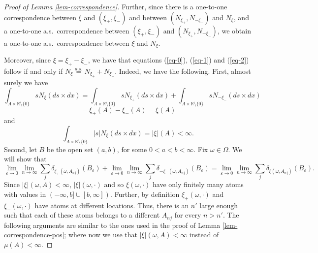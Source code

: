 \documentclass{article}
\theoremstyle{plain}
\theoremstyle{remark}
\begin{document}
\begin{proof}[Proof of Lemma \ref{lem-correspondence}]
	Further, since there is a one-to-one correspondence between $\xi$ and $(\xi_+,\xi_-)$ and between $(N_{\xi_+},N_{-\xi_-})$ and $N_{\xi}$, and a one-to-one a.s.~correspondence between $(\xi_+,\xi_-)$ and $(N_{\xi_+},N_{-\xi_-})$, we obtain a one-to-one a.s.~correspondence between $\xi$ and $N_{\xi}$.
	
	Moreover, since $\xi=\xi_+-\xi_-$, we have that equations (\ref{eq-0}), (\ref{eq-1}) and (\ref{eq-2}) follow if and only if $N_\xi\stackrel{a.s.}{=}N_{\xi_+}+N_{\xi_-}$. Indeed, we have the following. First, almost surely we have
	\begin{equation*}
		\int_{A\times \mathbb{R}\setminus\{0\}} sN_{\xi}(ds\times dx)= \int_{A\times \mathbb{R}\setminus\{0\}} sN_{\xi_+}(ds\times dx)+	\int_{A\times \mathbb{R}\setminus\{0\}} sN_{-\xi_-}(ds\times dx)
	\end{equation*}
	\begin{equation*}
		=\xi_+(A)-	\xi_-(A)= \xi(A)
	\end{equation*}
	and
	\begin{equation*}
		\int_{A\times \mathbb{R}\setminus\{0\}} |s|N_{\xi}(ds\times dx)= |\xi|(A)<\infty.
	\end{equation*}
	Second, let $B$ be the open set $(a,b)$, for some $0<a<b<\infty$. Fix $\omega\in\Omega$. We will show that
	\begin{equation}\label{delta}
		\lim\limits_{\varepsilon\to0}\lim\limits_{n\to\infty}\sum_{j}\delta_{\xi_+(\omega, A_{nj})}(B_\varepsilon)+	\lim\limits_{\varepsilon\to0}\lim\limits_{n\to\infty}\sum_{j}\delta_{-\xi_-(\omega,A_{nj})}(B_{\varepsilon})				=	\lim\limits_{\varepsilon\to0}\lim\limits_{n\to\infty}\sum_{j}\delta_{\xi(\omega,A_{nj})}(B_{\varepsilon}).
	\end{equation}
	Since $|\xi|(\omega,A)<\infty$, $|\xi|(\omega,\cdot)$ and so $\xi(\omega,\cdot)$ have only finitely many atoms with values in $(-\infty,b]\cup[b,\infty])$. Further, by definition $\xi_+(\omega,\cdot)$ and $\xi_-(\omega,\cdot)$ have atoms at different locations. Thus, there is an $n'$ large enough such that each of these atoms belongs to a different $A_{nj}$ for every $n>n'$. The following arguments are similar to the ones used in the proof of Lemma \ref{lem-correspondence-pos}; where now we use that $|\xi|(\omega,A)<\infty$ instead of $\mu(A)<\infty$. 
	

\end{proof}
\end{document}
